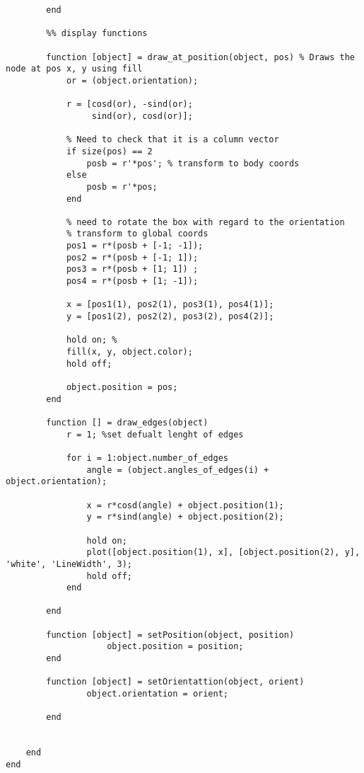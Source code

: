 \begin{lstlisting}
        end
       
        %% display functions
        
        function [object] = draw_at_position(object, pos) % Draws the node at pos x, y using fill
            or = (object.orientation);
            
            r = [cosd(or), -sind(or);
                 sind(or), cosd(or)];
        
            % Need to check that it is a column vector
            if size(pos) == 2 
                posb = r'*pos'; % transform to body coords
            else
                posb = r'*pos;
            end
            
            % need to rotate the box with regard to the orientation
            % transform to global coords
            pos1 = r*(posb + [-1; -1]);
            pos2 = r*(posb + [-1; 1]);
            pos3 = r*(posb + [1; 1]) ;
            pos4 = r*(posb + [1; -1]);
            
            x = [pos1(1), pos2(1), pos3(1), pos4(1)];
            y = [pos1(2), pos2(2), pos3(2), pos4(2)];
            
            hold on; % 
            fill(x, y, object.color);
            hold off;
            
            object.position = pos;
        end
        
        function [] = draw_edges(object)
            r = 1; %set defualt lenght of edges
            
            for i = 1:object.number_of_edges
                angle = (object.angles_of_edges(i) + object.orientation);
                
                x = r*cosd(angle) + object.position(1);
                y = r*sind(angle) + object.position(2);
             
                hold on;
                plot([object.position(1), x], [object.position(2), y], 'white', 'LineWidth', 3);
                hold off;
            end
        
        end
        
        function [object] = setPosition(object, position)
                    object.position = position;
        end
        
        function [object] = setOrientattion(object, orient)
                object.orientation = orient;
            
        end
        
        
    end 
end
 

\end{lstlisting}


